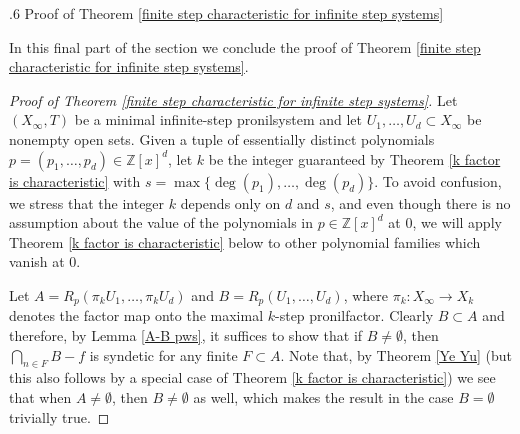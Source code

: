 \documentclass[reqno]{amsart}
\makeatletter
\def\Z{{\mathbb Z}}
\theoremstyle{definition}
\def\subsection{\@startsection{subsection}{2}%
  \z@{.4\linespacing\@plus.7\linespacing}
{.6\baselineskip}%
  {\normalfont\centering\bfseries}%
}
\theoremstyle{remark}
\makeatother
\begin{document}
\subsection{Proof of Theorem \ref{finite step characteristic for infinite step systems}}\label{final proof}


In this final part of the section we conclude the proof of 
Theorem \ref{finite step characteristic for infinite step systems}. 

\begin{proof}[Proof of Theorem \ref{finite step characteristic for infinite step systems}]
Let $(X_{\infty},T)$ be a minimal infinite-step pronilsystem and let $U_1,\ldots,U_d\subset X_{\infty}$ be nonempty open sets. 
Given a tuple of essentially distinct polynomials $p=(p_1,\ldots,p_d)\in \Z[x]^d$,
let $k$ be the integer guaranteed by 
Theorem \ref{k factor is characteristic} with 
$s=\max\{\deg(p_1),\ldots,\deg(p_d)\}$. To avoid confusion, 
we stress that the integer $k$ depends only on $d$ and $s$, 
and even though there is no assumption about the value of the polynomials in $p\in \Z[x]^d$ at $0$, we will apply Theorem \ref{k factor is characteristic} below to other polynomial families which vanish at $0$.

Let $A=R_p(\pi_k U_1,\ldots,\pi_k U_d)$ and $B=R_p(U_1,\ldots,U_d)$, where $\pi_k: X_{\infty}\to X_k$ denotes the factor map onto the maximal $k$-step pronilfactor. Clearly $B\subset A$ and therefore, by Lemma \ref{A-B pws}, it suffices to show that if $B\neq \emptyset$, then $\bigcap_{n\in F}B-f$ is syndetic for any finite $F\subset A$. Note that, by Theorem \ref{Ye Yu} (but this also follows by a special case of Theorem \ref{k factor is characteristic}) we see that when $A\neq \emptyset$, then $B\neq \emptyset$ as well, which makes the result in the case $B=\emptyset$ trivially true.


\end{proof}
\end{document}
